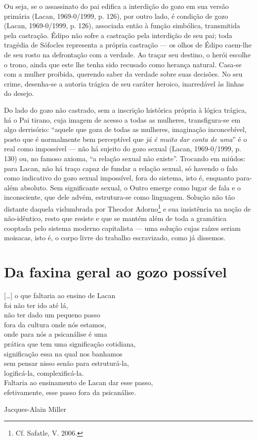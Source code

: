 Ou seja, se o assassinato do pai edifica a interdição do gozo em sua
versão primária (Lacan, 1969-0/1999, p. 126), por outro lado, é condição
de gozo (Lacan, 1969-0/1999, p. 126), associada então à função
simbólica, transmitida pela castração. Édipo não sofre a castração pela
interdição de seu pai; toda tragédia de Sófocles representa a própria
castração --- os olhos de Édipo caem-lhe de seu rosto na defrontação com
a verdade. Ao traçar seu destino, o herói escolhe o trono, ainda que
este lhe tenha sido recusado como herança natural. Casa-se com a mulher
proibida, querendo saber da verdade sobre suas decisões. No seu crime,
desenha-se a autoria trágica de seu caráter heroico, inarredável às
linhas do desejo.

Do lado do gozo não castrado, sem a inscrição histórica própria à lógica
trágica, há o Pai tirano, cuja imagem de acesso a todas as mulheres,
transfigura-se em algo derrisório: ``aquele que goza de todas as
mulheres, imaginação inconcebível, posto que é normalmente bem
perceptível que \emph{já é muito} \emph{dar conta de uma}'' é o real
como impossível --- não há sujeito do gozo sexual (Lacan, 1969-0/1999, p.
130) ou, no famoso axioma, ``a relação sexual não existe''. Trocando em
miúdos: para Lacan, não há traço capaz de fundar a relação sexual, só
havendo o falo como indicativo do gozo sexual impossível, fora do
sistema, isto é, enquanto para-além absoluto. Sem significante sexual, o
Outro emerge como lugar de fala e o inconsciente, que dele advém,
estrutura-se como linguagem. Solução não tão distante daquela
vislumbrada por Theodor Adorno\footnote{Cf. Safatle, V. 2006.} e sua
insistência na noção de não-idêntico, resto que resiste e que se mantém
além de toda a gramática cooptada pelo sistema moderno capitalista ---
uma solução cujas raízes seriam moisacas, isto é, o corpo livre do
trabalho escravizado, como já dissemos.

\section{Da faxina geral ao gozo possível}

\epigraph{{[}\ldots{}{]} o que faltaria ao ensino de Lacan\\
foi não ter ido até lá,\\
não ter dado um pequeno passo\\
fora da cultura onde nós estamos,\\
onde para nós a psicanálise é uma\\
prática que tem uma significação cotidiana,\\
significação essa na qual nos banhamos\\
sem pensar nisso senão para estruturá-la,\\
logificá-la, complexificá-la.\\
Faltaria ao ensinamento de Lacan dar esse passo,\\
efetivamente, esse passo fora da psicanálise.}{Jacques-Alain Miller}

